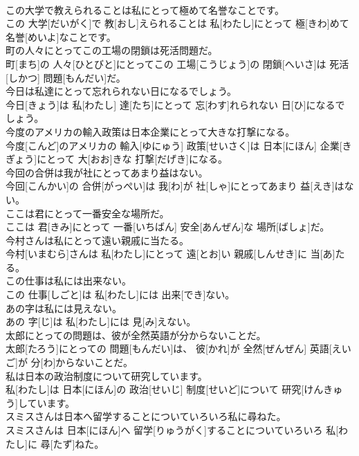 \documentclass[8pt]{extreport}
\begin{document}
\begin{CJK}{UTF8}{min}
\\	この大学で教えられることは私にとって極めて名誉なことです。	
\\	この 大学[だいがく]で 教[おし]えられることは 私[わたし]にとって 極[きわ]めて 名誉[めいよ]なことです。
\\	町の人々にとってこの工場の閉鎖は死活問題だ。	
\\	町[まち]の 人々[ひとびと]にとってこの 工場[こうじょう]の 閉鎖[へいさ]は 死活[しかつ] 問題[もんだい]だ。
\\	今日は私達にとって忘れられない日になるでしょう。	
\\	今日[きょう]は 私[わたし] 達[たち]にとって 忘[わす]れられない 日[ひ]になるでしょう。
\\	今度のアメリカの輸入政策は日本企業にとって大きな打撃になる。	
\\	今度[こんど]のアメリカの 輸入[ゆにゅう] 政策[せいさく]は 日本[にほん] 企業[きぎょう]にとって 大[おお]きな 打撃[だげき]になる。
\\	今回の合併は我が社にとってあまり益はない。	
\\	今回[こんかい]の 合併[がっぺい]は 我[わ]が 社[しゃ]にとってあまり 益[えき]はない。
\\	ここは君にとって一番安全な場所だ。	
\\	ここは 君[きみ]にとって 一番[いちばん] 安全[あんぜん]な 場所[ばしょ]だ。
\\	今村さんは私にとって遠い親戚に当たる。	
\\	今村[いまむら]さんは 私[わたし]にとって 遠[とお]い 親戚[しんせき]に 当[あ]たる。
\\	この仕事は私には出来ない。	
\\	この 仕事[しごと]は 私[わたし]には 出来[でき]ない。
\\	あの字は私には見えない。	
\\	あの 字[じ]は 私[わたし]には 見[み]えない。
\\	太郎にとっての問題は、彼が全然英語が分からないことだ。	
\\	太郎[たろう]にとっての 問題[もんだい]は、 彼[かれ]が 全然[ぜんぜん] 英語[えいご]が 分[わ]からないことだ。
\\	私は日本の政治制度について研究しています。	
\\	私[わたし]は 日本[にほん]の 政治[せいじ] 制度[せいど]について 研究[けんきゅう]しています。
\\	スミスさんは日本へ留学することについていろいろ私に尋ねた。	
\\	スミスさんは 日本[にほん]へ 留学[りゅうがく]することについていろいろ 私[わたし]に 尋[たず]ねた。

\end{CJK}
\end{document}
